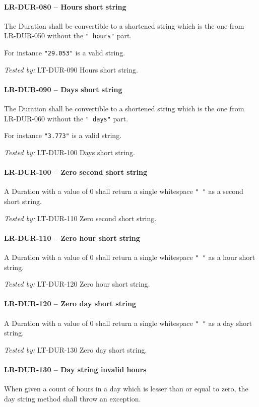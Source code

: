 \paragraph{LR-DUR-080 -- Hours short string}
The Duration shall be convertible to a shortened string
which is the one from LR-DUR-050 without the \lstinline{" hours"}
part.

For instance \lstinline{"29.053"} is a valid string.

\textit{Tested by: } LT-DUR-090 Hours short string.

\paragraph{LR-DUR-090 -- Days short string}
The Duration shall be convertible to a shortened string
which is the one from LR-DUR-060 without the \lstinline{" days"}
part.

For instance \lstinline{"3.773"} is a valid string.

\textit{Tested by: } LT-DUR-100 Days short string.

\paragraph{LR-DUR-100 -- Zero second short string}
A Duration with a value of 0 shall return a single whitespace
\lstinline{" "} as a second short string.

\textit{Tested by: } LT-DUR-110 Zero second short string.

\paragraph{LR-DUR-110 -- Zero hour short string}
A Duration with a value of 0 shall return a single whitespace
\lstinline{" "} as a hour short string.

\textit{Tested by: } LT-DUR-120 Zero hour short string.

\paragraph{LR-DUR-120 -- Zero day short string}
A Duration with a value of 0 shall return a single whitespace
\lstinline{" "} as a day short string.

\textit{Tested by: } LT-DUR-130 Zero day short string.

\paragraph{LR-DUR-130 -- Day string invalid hours}
When given a count of hours in a day which is lesser than or equal to zero,
the day string method shall throw an exception.

